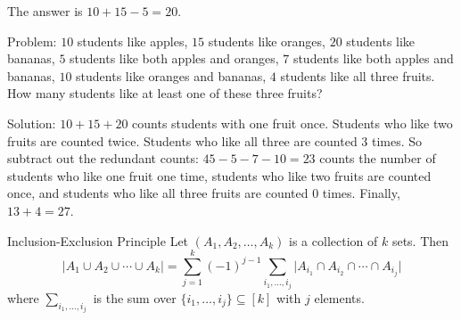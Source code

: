 \documentclass{report}
\begin{document}
The answer is $10 +  15 - 5 = 20$.

Problem: $10$ students like apples, $15$ students like oranges, $20$ students like bananas, $5$ students like both apples and oranges, $7$ students like both apples and bananas, $10$ students like oranges and bananas, $4$ students like all three fruits. How many students like at least one of these three fruits?

Solution: $10 + 15 + 20$ counts students with one fruit once. Students who like two fruits are counted twice. Students who like all three are counted $3$ times. So subtract out the redundant counts: $45 - 5 - 7 - 10 = 23$ counts the number of students who like one fruit one time, students who like two fruits are counted once, and students who like all three fruits are counted $0$ times. Finally, $13 + 4 = 27$.

\begin{theorem}{Inclusion-Exclusion Principle}
    Let $(A_{1}, A_{2}, \ldots , A_{k})$ is a collection of $k$ sets. Then
        \begin{equation*}
            \lvert A_{1} \cup A_{2} \cup \cdots \cup A_{k} \rvert = \sum_{j = 1}^{k} (-1)^{j - 1}\sum_{i_{1}, \ldots , i_{j}}^{} \lvert A_{i_{1}} \cap A_{i_{2}} \cap \cdots \cap A_{i_{j}} \rvert
        \end{equation*}
    where $\sum_{i_{1}, \ldots , i_{j}}^{}$ is the sum over $\{i_{1}, \ldots , i_{j}\} \subseteq [k]$ with $j$ elements.
\end{theorem}
\end{document}
